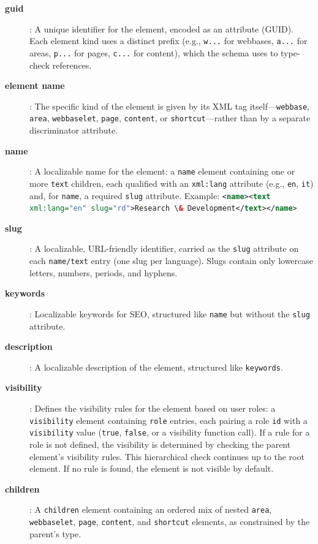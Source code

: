 \begin{description}
\item[\textbf{guid}]: A unique identifier for the element, encoded as an attribute (GUID). Each element kind uses a distinct prefix (e.g., \texttt{w...} for webbases, \texttt{a...} for areas, \texttt{p...} for pages, \texttt{c...} for content), which the schema uses to type-check references.
\item[\textbf{element name}]: The specific kind of the element is given by its XML tag itself---\texttt{webbase}, \texttt{area}, \texttt{webbaselet}, \texttt{page}, \texttt{content}, or \texttt{shortcut}---rather than by a separate discriminator attribute.
\item[\textbf{name}]: A localizable name for the element: a \texttt{name} element containing one or more \texttt{text} children, each qualified with an \texttt{xml:lang} attribute (e.g., \texttt{en}, \texttt{it}) and, for \texttt{name}, a required \texttt{slug} attribute. Example: \lstinline[language=XML]|<name><text xml:lang="en" slug="rd">Research \& Development</text></name>|
\item[\textbf{slug}]: A localizable, URL-friendly identifier, carried as the \texttt{slug} attribute on each \texttt{name/text} entry (one slug per language). Slugs contain only lowercase letters, numbers, periods, and hyphens.
\item[\textbf{keywords}]: Localizable keywords for SEO, structured like \texttt{name} but without the \texttt{slug} attribute.
\item[\textbf{description}]: A localizable description of the element, structured like \texttt{keywords}.
\item[\textbf{visibility}]: Defines the visibility rules for the element based on user roles: a \texttt{visibility} element containing \texttt{role} entries, each pairing a role \texttt{id} with a \texttt{visibility} value (\texttt{true}, \texttt{false}, or a visibility function call). If a rule for a role is not defined, the visibility is determined by checking the parent element's visibility rules. This hierarchical check continues up to the root element. If no rule is found, the element is not visible by default.
\item[\textbf{children}]: A \texttt{children} element containing an ordered mix of nested \texttt{area}, \texttt{webbaselet}, \texttt{page}, \texttt{content}, and \texttt{shortcut} elements, as constrained by the parent's type.
\end{description}

